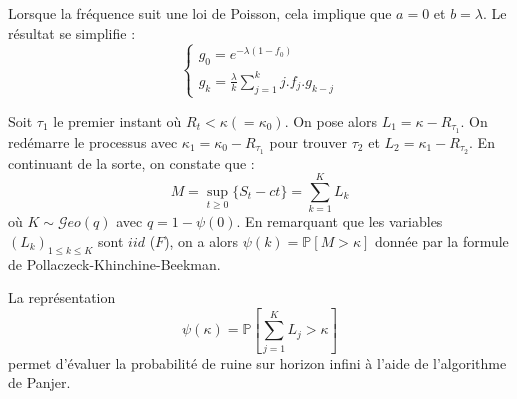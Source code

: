 \begin{f}
	Lorsque la fréquence suit une loi de Poisson, cela implique que {\color{OrangeProfondIRA} \(a=0\) et \(b=\lambda\).} 
	Le résultat se simplifie :
	\[
\begin{cases}
		g_0= e^{-\lambda (1-f_0)}
	\\
	g_k=\frac{\lambda}{k}\sum_{j=1}^k j . f_j  . g_{k-j}
\end{cases}	
\]
	
\end{f}

\begin{f}
	
	Soit \(\tau_1\) le premier instant où \(R_t<\kappa(=\kappa_0)\). On pose alors  \(L_1=\kappa -R_{\tau_1}\).
	On redémarre le processus avec \(\kappa_1=\kappa_0-R_{\tau_1}\) pour trouver  \(\tau_2\) et \(L_2=\kappa_1 -R_{\tau_2}\).
	En continuant de la sorte, on constate que :
	\[
	M=\sup_{t\geq 0}\{ S_t -ct \} =\sum_{k=1}^{K}L_k
	\]
	où \(K\sim \mathcal{G}eo(q)\) avec \(q=1-\psi(0)\).  
	En remarquant que les variables \(\left(  L_k\right)_{1\leq k\leq K}\) sont \(iid\) (\(F\)), on a alors \(\psi(k)=\mathbb{P}[M>\kappa]\) donnée par la formule de Pollaczeck-Khinchine-Beekman.
	
	
	La représentation 
	\[
	\psi(\kappa)=\mathbb{P}\left[\sum_{j = 1}^{K}L_j>\kappa \right] 
	\]
	permet d'évaluer la probabilité de ruine sur horizon infini à l'aide de l'algorithme de Panjer.
	
\end{f}





